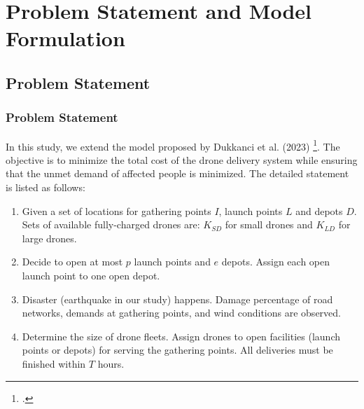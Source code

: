 \documentclass[aspectratio=169]{beamer}
\begin{document}
\section{Problem Statement and Model Formulation}
\subsection{Problem Statement}
\begin{frame}
    \frametitle{Problem Statement}
    In this study, we extend the model proposed by Dukkanci et al. (2023) \footcites{dukkanci2023drones}. The objective is to minimize the total cost of the drone delivery system while ensuring that the unmet demand of affected people is minimized. The detailed statement is listed as follows:
    \begin{enumerate}[label=\arabic*.]
        \item Given a set of locations for gathering points $I$, launch points $L$ and depots $D$. Sets of available fully-charged drones are: $K_{SD}$ for small drones and $K_{LD}$ for large drones. 
        \item Decide to open at most $p$ launch points and $e$ depots. Assign each open launch point to one open depot.
        \item Disaster (earthquake in our study) happens. Damage percentage of road networks, demands at gathering points, and wind conditions are observed.
        \item Determine the size of drone fleets. Assign drones to open facilities (launch points or depots) for serving the gathering points. All deliveries must be finished within $T$ hours. 
    \end{enumerate}
\end{frame}
\end{document}
